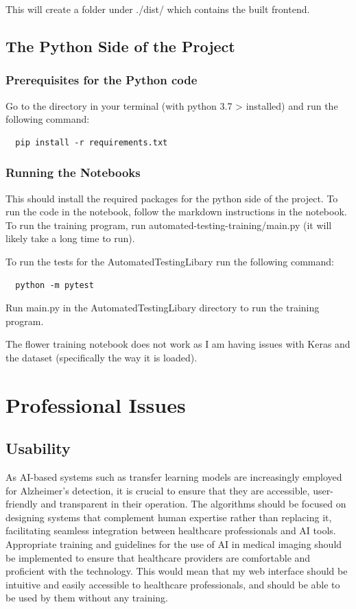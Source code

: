 \documentclass[]{final_report}
\begin{document}
This will create a folder under ./dist/ which contains the built frontend.

\section{The Python Side of the Project}

\subsection{Prerequisites for the Python code}
Go to the directory in your terminal (with python 3.7 > installed) and run the following command:
\begin{lstlisting}
  pip install -r requirements.txt
\end{lstlisting}

\subsection{Running the Notebooks}

This should install the required packages for the python side of the project.
To run the code in the notebook, follow the markdown instructions in the notebook.
To run the training program, run automated-testing-training/main.py (it will likely take a long time to run).

To run the tests for the AutomatedTestingLibary run the following command:
\begin{lstlisting}
  python -m pytest 
\end{lstlisting}
Run main.py in the AutomatedTestingLibary directory to run the training program.

The flower training notebook does not work as I am having issues with Keras and the dataset (specifically the way it is loaded).

\chapter{Professional Issues}


\section{Usability}
As AI-based systems such as transfer learning models are increasingly employed for Alzheimer's detection, it is crucial to ensure that they are accessible, user-friendly and transparent in their operation. The algorithms should be focused on designing systems that complement human expertise rather than replacing it, facilitating seamless integration between healthcare professionals and AI tools. Appropriate training and guidelines for the use of AI in medical imaging should be implemented to ensure that healthcare providers are comfortable and proficient with the technology. This would mean that my web interface should be intuitive and easily accessible to healthcare professionals, and should be able to be used by them without any training.
\end{document}
